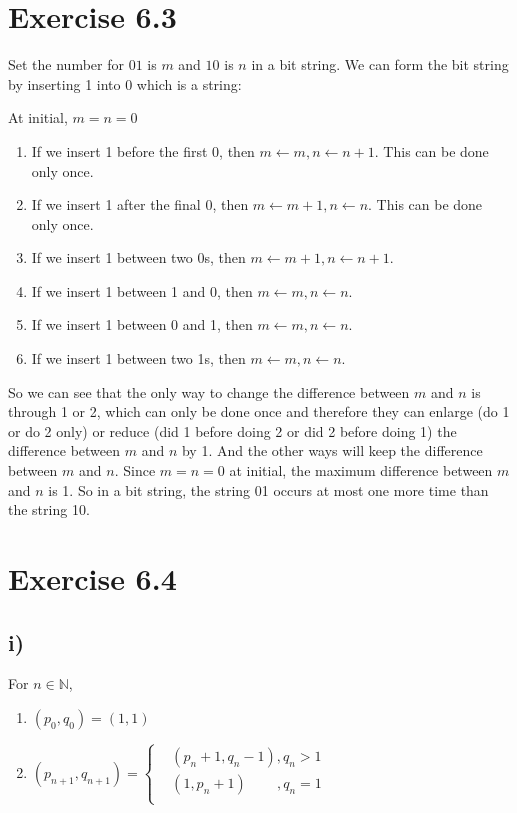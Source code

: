 \documentclass[a4paper,12pt,titlepage]{article}
\begin{document}
\section*{Exercise 6.3}
Set the number for $01$ is $m$ and $10$ is $n$ in a bit string. We can form the bit string by inserting 1 into 0 which is a string:

At initial, $m=n=0$
\begin{enumerate}
\item If we insert 1 before the first 0, then $m\leftarrow m,n\leftarrow n+1$. This can be done only once.
\item If we insert 1 after the final 0, then $m\leftarrow m+1,n\leftarrow n$. This can be done only once.
\item If we insert 1 between two 0s, then $m\leftarrow m+1,n\leftarrow n+1$.
\item If we insert 1 between 1 and 0, then $m\leftarrow m,n\leftarrow n$.
\item If we insert 1 between 0 and 1, then $m\leftarrow m,n\leftarrow n$.
\item If we insert 1 between two 1s, then $m\leftarrow m,n\leftarrow n$.
\end{enumerate}
So we can see that the only way to change the difference between $m$ and $n$ is through 1 or 2, which can only be done once and therefore they can enlarge (do 1 or do 2 only) or reduce (did 1 before doing 2 or did 2 before doing 1) the difference between $m$ and $n$ by 1.  And the other ways will keep the difference between $m$ and $n$. Since $m=n=0$ at initial, the maximum difference between $m$ and $n$ is 1. So in a bit string, the string 01 occurs at most one more time than the string 10.

\section*{Exercise 6.4}

\subsection*{i)}
For $n\in\mathbb{N}$,
\begin{enumerate}
\item $(p_0,q_0)=(1,1)$
\item  $(p_{n+1},q_{n+1})=\left\{
\begin{aligned}
&(p_n+1,q_n-1),q_n>1\\
&(1,p_n+1)\quad\quad\,, q_n=1\\
\end{aligned}
\right.
$
\end{enumerate}
\end{document}
